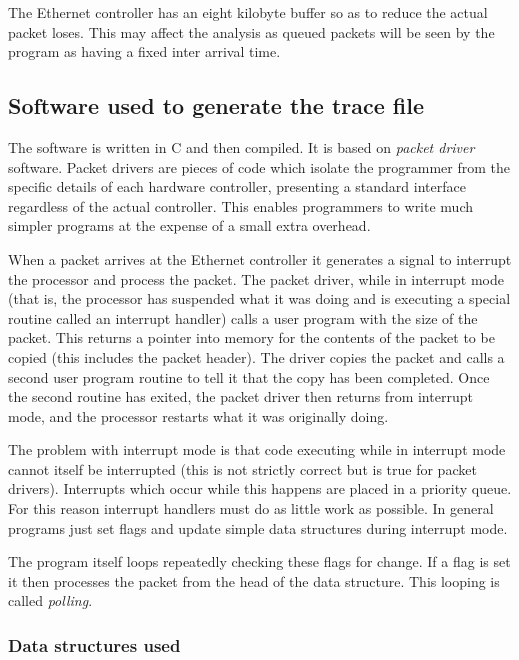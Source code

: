 The Ethernet controller has an eight kilobyte buffer so as to reduce
the actual packet loses.  This may affect the analysis as queued
packets will be seen by the program as having a fixed inter arrival
time.

\subsection{Software used to generate the trace file}

The software is written in C and then compiled.  It is based on {\em
packet driver} software.  Packet drivers are pieces of code which
isolate the programmer from the specific details of each hardware
controller, presenting a standard interface regardless of the actual
controller.  This enables programmers to write much simpler programs
at the expense of a small extra overhead.

When a packet arrives at the Ethernet controller it generates a signal
to interrupt the processor and process the packet.  The packet driver,
while in interrupt mode (that is, the processor has suspended what it
was doing and is executing a special routine called an interrupt
handler) calls a user program with the size of the packet.  This
returns a pointer into memory for the contents of the packet to be
copied (this includes the packet header).  The driver copies the
packet and calls a second user program routine to tell it that the
copy has been completed.  Once the second routine has exited, the
packet driver then returns from interrupt mode, and the processor
restarts what it was originally doing.

The problem with interrupt mode is that code executing while in
interrupt mode cannot itself be interrupted (this is not strictly
correct but is true for packet drivers).  Interrupts which occur while
this happens are placed in a priority queue.  For this reason
interrupt handlers must do as little work as possible.  In general
programs just set flags and update simple data structures during
interrupt mode.

The program itself loops repeatedly checking these flags for change.
If a flag is set it then processes the packet from the head of the
data structure.  This looping is called {\em polling}.

\subsubsection{Data structures used}

